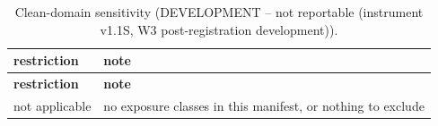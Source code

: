 \begingroup\footnotesize
\begin{longtable}{>{\raggedright\arraybackslash}p{126.4pt}>{\raggedright\arraybackslash}p{304.6pt}}
\caption{Clean-domain sensitivity (DEVELOPMENT -- not reportable (instrument v1.1S, W3 post-registration development)).} \\
\toprule
\textbf{restriction} & \textbf{note} \\
\midrule
\endfirsthead
\toprule
\textbf{restriction} & \textbf{note} \\
\midrule
\endhead
\bottomrule
\endfoot
not applicable & no exposure classes in this manifest, or nothing to exclude \\
\end{longtable}
\endgroup
